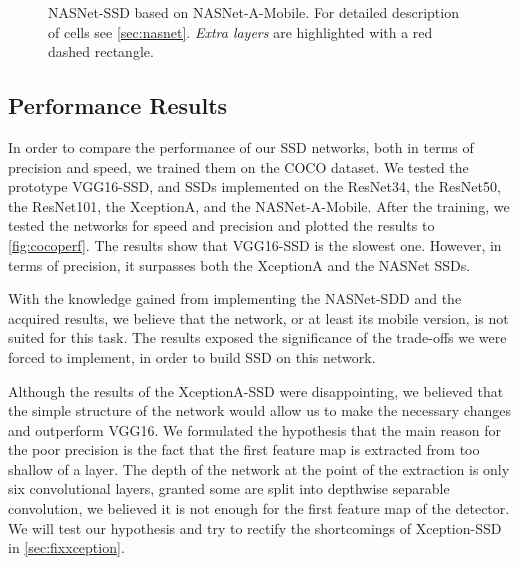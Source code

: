 \begin{figure}
    \centering
    \nasnetSSD
    \caption[NASNet-SSD]%
    {NASNet-SSD based on NASNet-A-Mobile. For detailed description of cells see \cref{sec:nasnet}. \textit{Extra layers} are highlighted with a red dashed rectangle.}
    \label{fig:nasnetSSD}
\end{figure}

\subsection{Performance Results} In order to compare the performance of our SSD networks, both in terms of precision and speed, we trained them on the COCO dataset. We tested the prototype VGG16-SSD, and SSDs implemented on the ResNet34, the ResNet50, the ResNet101, the XceptionA, and the NASNet-A-Mobile. After the training, we tested the networks for speed and precision and plotted the results to \cref{fig:cocoperf}. The results show that VGG16-SSD is the slowest one. However, in terms of precision, it surpasses both the XceptionA and the NASNet SSDs.

With the knowledge gained from implementing the NASNet-SDD and the acquired results, we believe that the network, or at least its mobile version, is not suited for this task. The results exposed the significance of the trade-offs we were forced to implement, in order to build SSD on this network.

Although the results of the XceptionA-SSD were disappointing, we believed that the simple structure of the network would allow us to make the necessary changes and outperform VGG16. We formulated the hypothesis that the main reason for the poor precision is the fact that the first feature map is extracted from too shallow of a layer. The depth of the network at the point of the extraction is only six convolutional layers, granted some are split into depthwise separable convolution, we believed it is not enough for the first feature map of the detector. We will test our hypothesis and try to rectify the shortcomings of Xception-SSD in \cref{sec:fixxception}.


